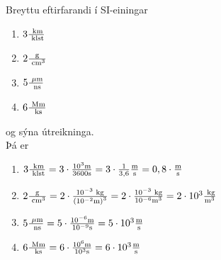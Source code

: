 \begin{formalexample}
Breyttu eftirfarandi í SI-einingar
\begin{enumerate}
	\item $3 \frac{\textrm{ k}\textrm{m}}{\textrm{ klst}}$
	\item $2 \frac{\textrm{g}}{\textrm{ c}\textrm{m}^3}$
	\item $5 \frac{\text{ $\mu$}\textrm{m}}{\textrm{ n}\textrm{s}}$
	\item $6 \frac{\textrm{ M}\textrm{m}}{\textrm{ k}\textrm{s}}$
\end{enumerate}
og sýna útreikninga.
\\[4 ex]
Þá er
\begin{enumerate}
	\item $3 \frac{\textrm{ k}\textrm{m}}{\textrm{ klst}} 
		= 3 \cdot \frac{10^{3}\textrm{m}}{3600 \textrm{s}}
		= 3 \cdot \frac{1}{3,6} \frac{\textrm{m}}{\textrm{s}}
		= 0,8 \cdot \frac{\textrm{m}}{\textrm{s}}$
	\item $2 \frac{\textrm{g}}{\textrm{ c}\textrm{m}^3}
		= 2 \cdot \frac{10^{-3} \textrm{ k}\textrm{g}}{\left( 10^{-2} \textrm{m} \right)^3}
		= 2 \cdot \frac{10^{-3} \textrm{ k}\textrm{g}}{10^{-6} \textrm{m}^3}
		= 2 \cdot 10^{3} \frac{\textrm{ k}\textrm{g}}{\textrm{m}^3}
		$
	\item $5 \frac{\text{ $\mu$}\textrm{m}}{\textrm{ n}\textrm{s}}
		= 5 \cdot \frac{10^{-6}\textrm{m}}{10^{-9}\textrm{s}}
		= 5 \cdot 10^{3} \frac{\textrm{m}}{\textrm{s}}
		$
	\item $6 \frac{\textrm{ M}\textrm{m}}{\textrm{ k}\textrm{s}}
		= 6 \cdot \frac{10^{6}\textrm{m}}{10^{3}\textrm{s}}
		= 6 \cdot 10^{3} \frac{\textrm{m}}{\textrm{s}}
		$
\end{enumerate}
\end{formalexample}

